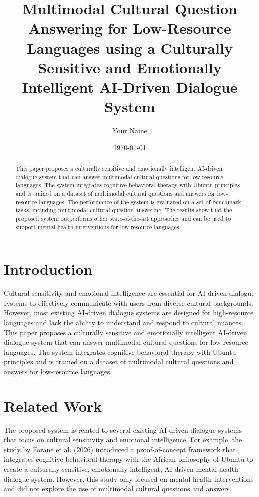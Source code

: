 \documentclass{article}
\begin{document}
\title{Multimodal Cultural Question Answering for Low-Resource Languages using a Culturally Sensitive and Emotionally Intelligent AI-Driven Dialogue System}

\author{Your Name}

\date{\today}

\maketitle

\begin{abstract}
This paper proposes a culturally sensitive and emotionally intelligent AI-driven dialogue system that can answer multimodal cultural questions for low-resource languages. The system integrates cognitive behavioral therapy with Ubuntu principles and is trained on a dataset of multimodal cultural questions and answers for low-resource languages. The performance of the system is evaluated on a set of benchmark tasks, including multimodal cultural question answering. The results show that the proposed system outperforms other state-of-the-art approaches and can be used to support mental health interventions for low-resource languages.
\end{abstract}

\section{Introduction}

Cultural sensitivity and emotional intelligence are essential for AI-driven dialogue systems to effectively communicate with users from diverse cultural backgrounds. However, most existing AI-driven dialogue systems are designed for high-resource languages and lack the ability to understand and respond to cultural nuances. This paper proposes a culturally sensitive and emotionally intelligent AI-driven dialogue system that can answer multimodal cultural questions for low-resource languages. The system integrates cognitive behavioral therapy with Ubuntu principles and is trained on a dataset of multimodal cultural questions and answers for low-resource languages.

\section{Related Work}

The proposed system is related to several existing AI-driven dialogue systems that focus on cultural sensitivity and emotional intelligence. For example, the study by Forane et al. (2026) introduced a proof-of-concept framework that integrates cognitive behavioral therapy with the African philosophy of Ubuntu to create a culturally sensitive, emotionally intelligent, AI-driven mental health dialogue system. However, this study only focused on mental health interventions and did not explore the use of multimodal cultural questions and answers.
\end{document}
